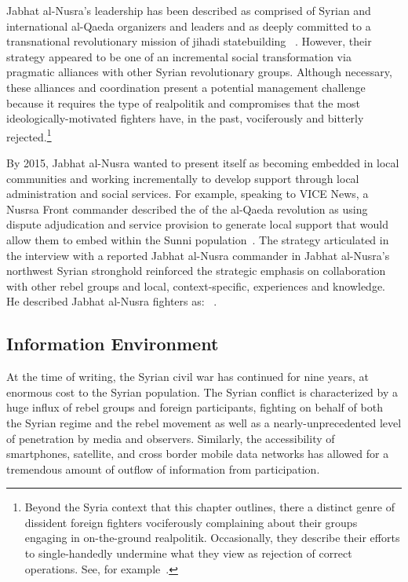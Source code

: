 Jabhat al-Nusra's leadership has been described as comprised of Syrian and international al-Qaeda organizers and leaders and as deeply committed to a transnational revolutionary mission of jihadi statebuilding ~\autocite{lister2016profiling}. However, their strategy appeared to be one of an incremental social transformation via pragmatic alliances with other Syrian revolutionary groups. Although necessary, these alliances and coordination present a potential management challenge because it requires the type of realpolitik and compromises that the most ideologically-motivated fighters have, in the past, vociferously and bitterly rejected.\footnote{Beyond the Syria context that this chapter outlines, there a distinct genre of dissident foreign fighters vociferously complaining about their groups engaging in on-the-ground realpolitik. Occasionally, they describe their efforts to single-handedly undermine what they view as rejection of correct operations. See, for example~\cite{collins2002my, hammami2013FA1}.}

By 2015, Jabhat al-Nusra wanted to present itself as becoming embedded in local communities and working incrementally to develop support through local administration and social services. For example, speaking to VICE News, a Nusrsa Front commander described the  of the al-Qaeda revolution as using dispute adjudication and service provision to generate local support that would allow them to embed within the Sunni population~\autocite{dareih2015unmasked}. The strategy articulated in the interview with a reported Jabhat al-Nusra commander in Jabhat al-Nusra's northwest Syrian stronghold reinforced the strategic emphasis on collaboration with other rebel groups and local, context-specific, experiences and knowledge. He described Jabhat al-Nusra fighters as: ~\autocite{dareih2015unmasked}.

\subsection{Information Environment}

At the time of writing, the Syrian civil war has continued for nine years, at enormous cost to the Syrian population. The Syrian conflict is characterized by a huge influx of rebel groups and foreign participants, fighting on behalf of both the Syrian regime and the rebel movement as well as a nearly-unprecedented level of penetration by media and observers. Similarly, the accessibility of smartphones, satellite, and cross border mobile data networks has allowed for a tremendous amount of outflow of information from participation. 

